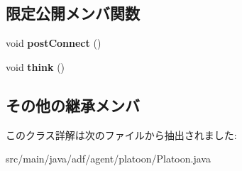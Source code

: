 \subsection*{限定公開メンバ関数}
\begin{DoxyCompactItemize}
\item 
\hypertarget{classadf_1_1agent_1_1platoon_1_1Platoon_adee23d3f90f95d1f834c50bd55a6036e}{}\label{classadf_1_1agent_1_1platoon_1_1Platoon_adee23d3f90f95d1f834c50bd55a6036e} 
void {\bfseries post\+Connect} ()
\item 
\hypertarget{classadf_1_1agent_1_1platoon_1_1Platoon_a9fe4bca1e1a3ca8e1086689251c6b272}{}\label{classadf_1_1agent_1_1platoon_1_1Platoon_a9fe4bca1e1a3ca8e1086689251c6b272} 
void {\bfseries think} ()
\end{DoxyCompactItemize}
\subsection*{その他の継承メンバ}


このクラス詳解は次のファイルから抽出されました\+:\begin{DoxyCompactItemize}
\item 
src/main/java/adf/agent/platoon/Platoon.\+java\end{DoxyCompactItemize}
